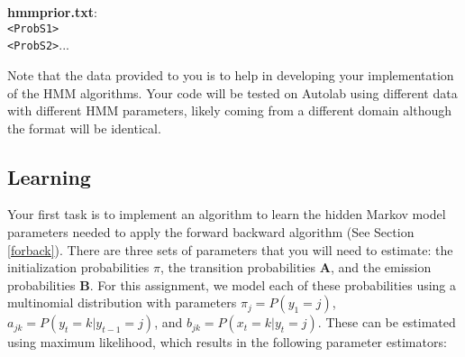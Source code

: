 \documentclass{article}
\begin{document}
\begin{enumerate}
    \textbf{hmmprior.txt}:\\
    \texttt{<ProbS1>}\\
     \texttt{<ProbS2>}...\\


\end{enumerate}

Note that the data provided to you is to help in developing your implementation of the HMM algorithms. Your code will be tested on Autolab using different data with different HMM parameters, likely coming from a different domain although the format will be identical.

\subsection{Learning}\label{learn}
Your first task is to implement an algorithm to learn the hidden Markov model parameters needed to apply the forward backward algorithm (See Section \ref{forback}). There are three sets of parameters that you will need to estimate: the initialization probabilities {\boldmath$\pi$}, the transition probabilities $\mathbf A$, and the emission probabilities $\mathbf B$. For this assignment, we model each of these probabilities using a multinomial distribution with parameters $ \pi_j=P(y_1=j)$, $ a_{jk} = P(y_{t}=k\vert y_{t-1}=j)$, and $ b_{jk} = P(x_t=k\vert y_{t}=j)$. These can be estimated using maximum likelihood, which results in the following parameter estimators:
\end{document}
